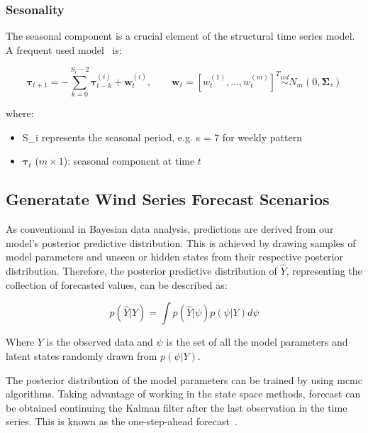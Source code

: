 \subsubsection{Sesonality}
    \label{sec:seasonality_component}

    The seasonal component is a crucial element of the structural time series model.
    A frequent used model~\cite{qiu_multivariate_2018} is:

    \begin{equation}
        \bm{\tau}_{t+1} = - \sum_{k=0}^{S_{i}-2} \bm{\tau}_{t-k}^{(i)} + \bm{w}_{t}^{(i)},
            \qquad \bm{w}_{t} = [w_{t}^{(1)}, \ldots, w_{t}^{(m)}]^{T}
            \stackrel{\textit{iid}}{\sim} N_{m}(0, \bm{\Sigma}_{\tau})
        \label{eq:seasonal}
    \end{equation}

    where:
    \begin{itemize}
        \item S_{i} represents the seasonal period, e.g. s = 7 for weekly pattern
        \item $\bm{\tau}_{t}$ ($m \times 1$): seasonal component at time $t$
    \end{itemize}

\subsection{Generatate Wind Series Forecast Scenarios}
    \label{sec:wind_forecast_scenarios}

    As conventional in Bayesian data analysis, predictions are derived from our model's posterior predictive distribution.
    This is achieved by drawing samples of model parameters and unseen or hidden states from their respective posterior distribution.
    Therefore, the posterior predictive distribution of $\hat{Y}$, representing the collection of forecasted values, can be described as:

    \begin{equation}
        p(\hat{Y} | Y) = \int p(\hat{Y} | \psi) p(\psi | Y) d\psi
    \label{eq:posterior_predictive}
    \end{equation}

    Where $Y$ is the observed data and $\psi$ is the set of all the model parameters and latent states randomly drawn from
    $p(\psi | Y)$.

    The posterior distribution of the model parameters can be trained by using \gls{mcmc} algorithms.
    Taking advantage of working in the state space methods, forecast can be obtained continuing the Kalman filter after
    the last observation in the time series.
    This is known as the one-step-ahead forecast~\cite{durbin_time_2012}. \\

